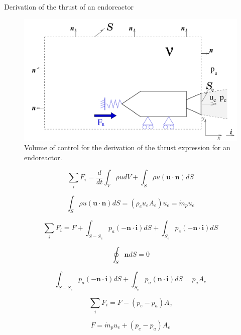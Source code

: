 \documentclass[
  ignorenonframetext,
]{beamer}
\begin{document}
\begin{frame}{Derivation of the thrust of an endoreactor}
\protect\hypertarget{derivation-of-the-thrust-of-an-endoreactor}{}
\begin{figure}

{\centering \includegraphics{figs/fig3.3.png}

}

\caption{Volume of control for the derivation of the thrust expression
for an endoreactor.}

\end{figure}
\end{frame}

\begin{frame}
\begin{equation}
\sum_{i}F_{i}=\frac{d}{dt}\int_{V}\rho udV+\int_{S}\rho u\left(\boldsymbol{u}\cdot\boldsymbol{n}\right)dS
\end{equation}

\begin{equation}
\int_{S}\rho u\left(\boldsymbol{u}\cdot\boldsymbol{n}\right)dS=\left(\rho_{e}u_{e}A_{e}\right)u_{e}=\dot{m}_{p}u_{e}
\end{equation}

\begin{equation}
\sum_{i}F_{i}=F+\int_{S-S_{e}}p_{a}\left(-\boldsymbol{n}\cdot \boldsymbol{i}\right)dS+\int_{S_{e}}p_{e}\left(-\boldsymbol{n}\cdot \boldsymbol{i}\right)dS
\end{equation}

\begin{equation}
\oint_{S}\boldsymbol{n}dS=0
\end{equation}

\begin{equation}
\int_{S-S_{e}}p_{a}\left(-\boldsymbol{n}\cdot\boldsymbol{i}\right)dS+\int_{S_{e}}p_{a}\left(\boldsymbol{n}\cdot\boldsymbol{i}\right)dS=p_{a}A_{e}
\end{equation}

\begin{equation}
\sum_{i}F_{i}=F-\left(p_{e}-p_{a}\right)A_{e}
\end{equation}

\begin{equation}
F=\dot{m}_{p}u_{e}+\left(p_{e}-p_{a}\right)A_{e}
\end{equation}
\end{frame}
\end{document}
